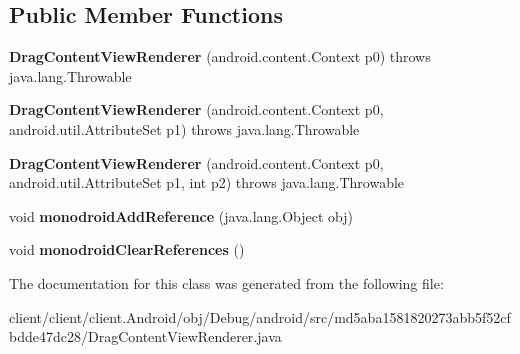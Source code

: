 \subsection*{Public Member Functions}
\begin{DoxyCompactItemize}
\item 
\hypertarget{classmd5aba1581820273abb5f52cfbdde47dc28_1_1DragContentViewRenderer_acbaab26f719b40be4eb1c8e92085eabb}{}{\bfseries Drag\+Content\+View\+Renderer} (android.\+content.\+Context p0)  throws java.\+lang.\+Throwable 	\label{classmd5aba1581820273abb5f52cfbdde47dc28_1_1DragContentViewRenderer_acbaab26f719b40be4eb1c8e92085eabb}

\item 
\hypertarget{classmd5aba1581820273abb5f52cfbdde47dc28_1_1DragContentViewRenderer_a5d05ff1c1e83d8e9796a8840e2d3c26d}{}{\bfseries Drag\+Content\+View\+Renderer} (android.\+content.\+Context p0, android.\+util.\+Attribute\+Set p1)  throws java.\+lang.\+Throwable 	\label{classmd5aba1581820273abb5f52cfbdde47dc28_1_1DragContentViewRenderer_a5d05ff1c1e83d8e9796a8840e2d3c26d}

\item 
\hypertarget{classmd5aba1581820273abb5f52cfbdde47dc28_1_1DragContentViewRenderer_aa206d830b74aaac0e5e2d40abfca66a2}{}{\bfseries Drag\+Content\+View\+Renderer} (android.\+content.\+Context p0, android.\+util.\+Attribute\+Set p1, int p2)  throws java.\+lang.\+Throwable 	\label{classmd5aba1581820273abb5f52cfbdde47dc28_1_1DragContentViewRenderer_aa206d830b74aaac0e5e2d40abfca66a2}

\item 
\hypertarget{classmd5aba1581820273abb5f52cfbdde47dc28_1_1DragContentViewRenderer_a5a1842738ef0cc7ccaafda2db12f6706}{}void {\bfseries monodroid\+Add\+Reference} (java.\+lang.\+Object obj)\label{classmd5aba1581820273abb5f52cfbdde47dc28_1_1DragContentViewRenderer_a5a1842738ef0cc7ccaafda2db12f6706}

\item 
\hypertarget{classmd5aba1581820273abb5f52cfbdde47dc28_1_1DragContentViewRenderer_a60a1f50cb32e6456bd891403f77200a8}{}void {\bfseries monodroid\+Clear\+References} ()\label{classmd5aba1581820273abb5f52cfbdde47dc28_1_1DragContentViewRenderer_a60a1f50cb32e6456bd891403f77200a8}

\end{DoxyCompactItemize}


The documentation for this class was generated from the following file\+:\begin{DoxyCompactItemize}
\item 
client/client/client.\+Android/obj/\+Debug/android/src/md5aba1581820273abb5f52cfbdde47dc28/Drag\+Content\+View\+Renderer.\+java\end{DoxyCompactItemize}
